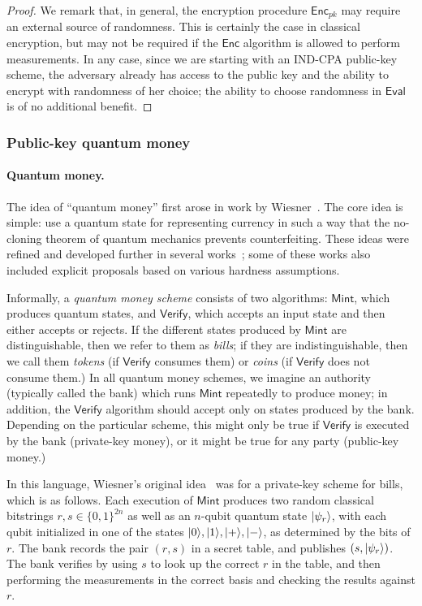 \documentclass[envcountsame]{llncs}
\numberwithin{equation}{section}
\newcommand{\Enc}{\ensuremath{\mathsf{Enc}}\xspace}
\newcommand{\Mint}{\ensuremath{\mathsf{Mint}}\xspace}
\newcommand{\Verify}{\ensuremath{\mathsf{Verify}}\xspace}
\newcommand\Eval{\ensuremath{\mathsf{Eval}}\xspace}
\begin{document}
\begin{proof}
We remark that, in general, the encryption procedure $\Enc_{pk}$ may require an external source of randomness. This is certainly the case in classical encryption, but may not be required if the $\Enc$ algorithm is allowed to perform measurements. In any case, since we are starting with an IND-CPA public-key scheme, the adversary already has access to the public key and the ability to encrypt with randomness of her choice; the ability to choose randomness in $\Eval$ is of no additional benefit.
\end{proof}

\subsubsection{Public-key quantum money}

\paragraph{Quantum money.}
The idea of ``quantum money'' first arose in work by Wiesner~\cite{Wie1983}. The core idea is simple: use a quantum state for representing currency in such a way that the no-cloning theorem of quantum mechanics prevents counterfeiting. These ideas were refined and developed further in several works~\cite{Aar09, AC12, BBBW83, FGHLS12, MS10}; some of these works also included explicit proposals based on various hardness assumptions. 

Informally, a \emph{quantum money scheme} consists of two algorithms: \Mint, which produces quantum states, and \Verify, which accepts an input state and then either accepts or rejects. If the different states produced by \Mint are distinguishable, then we refer to them as \emph{bills}; if they are indistinguishable, then we call them \emph{tokens} (if \Verify consumes them) or \emph{coins} (if \Verify does not consume them.) In all quantum money schemes, we imagine an authority (typically called the bank) which runs \Mint repeatedly to produce money; in addition, the \Verify algorithm should accept only on states produced by the bank. Depending on the particular scheme, this might only be true if \Verify is executed by the bank (private-key money), or it might be true for any party (public-key money.)

In this language, Wiesner's original idea~\cite{Wie1983} was for a private-key scheme for bills, which is as follows. Each execution of \Mint produces two random classical bitstrings $r, s \in \{0, 1\}^{2n}$ as well as an $n$-qubit quantum state ${\left\vert{\psi_r}\right\rangle}$, with each qubit initialized in one of the states ${\left\vert{0}\right\rangle}, {\left\vert{1}\right\rangle}, {\left\vert{+}\right\rangle}, {\left\vert{-}\right\rangle}$, as determined by the bits of $r$. The bank records the pair $(r, s)$ in a secret table, and publishes $(s, {\left\vert{\psi_r}\right\rangle})$. The bank verifies by using $s$ to look up the correct $r$ in the table, and then performing the measurements in the correct basis and checking the results against $r$. 
\end{document}
